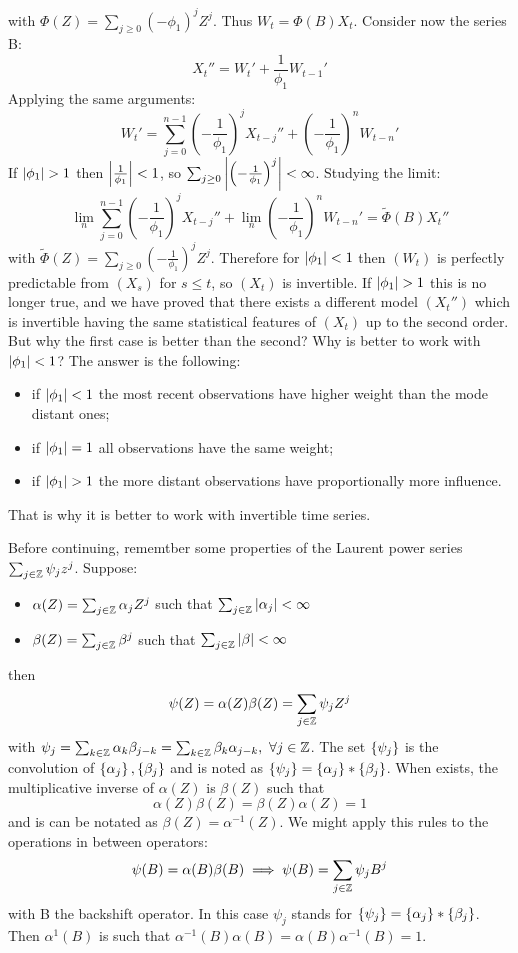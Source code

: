 \begin{example}
\[    \]
    with $\Phi(Z)=\sum_{j\ge0}(-\phi_1)^jZ^j$. Thus $W_t=\Phi(B)X_t$. Consider now the series B:
    \[
        X_t''=W_t'+\frac{1}{\phi_1}W_{t-1}'  
    \]
    Applying the same arguments:
    \[
        W_t'=\sum_{j=0}^{n-1}\left(-\frac{1}{\phi_1}\right)^jX_{t-j}''+\left(-\frac{1}{\phi_1}\right)^nW_{t-n}'
    \]
    If $\abs{\phi_1}>1$ then $\left|\frac{1}{\phi_1}\right|<1$, so $\sum_{j\ge0}\left|\left(-\frac{1}{\phi_1}\right)^j\right|<\infty$. Studying the limit:
    \[
        \lim_n\sum_{j=0}^{n-1}\left(-\frac{1}{\phi_1}\right)^jX_{t-j}''+\lim_n\left(-\frac{1}{\phi_1}\right)^nW_{t-n}'=\tilde{\Phi}(B)X_t'' 
    \]
    with $\tilde{\Phi}(Z)=\sum_{j\ge0}\left(-\frac{1}{\phi_1}\right)^jZ^j$. Therefore for $\left|\phi_1\right|<1$ then $(W_t)$ is perfectly predictable from $(X_s)$ for $s\le t$, so $(X_t)$ is invertible. If $\abs{\phi_1}>1$ this is no longer true, and we have proved that there exists a different model $(X_t'')$ which is invertible having the same statistical features of $(X_t)$ up to the second order. But why the first case is better than the second? Why is better to work with $\left|\phi_1\right|<1$? The answer is the following:
    \begin{itemize}
        \item if $\left|\phi_1\right|<1$ the most recent observations have higher weight than the mode distant ones;
        \item if $\left|\phi_1\right|=1$ all observations have the same weight;
        \item if $\abs{\phi_1}>1$ the more distant observations have proportionally more influence.
    \end{itemize}
    That is why it is better to work with invertible time series.
\end{example}

Before continuing, rememtber some properties of the Laurent power series $\sum_{j\in\mathbb{Z}}\psi_jz^j$. Suppose:
\begin{itemize}
    \item $\alpha(Z)=\sum_{j\in\mathbb{Z}}\alpha_jZ^j$ such that $\sum_{j\in\mathbb{Z}}\left|\alpha_j\right|<\infty$
    \item $\beta(Z)=\sum_{j\in\mathbb{Z}}\beta^j$ such that $\sum_{j\in\mathbb{Z}}\left|\beta\right|<\infty$
\end{itemize}
then
\[
    \psi(Z)=\alpha(Z)\beta(Z)=\sum_{j\in\mathbb{Z}}\psi_jZ^j  
\]
with $\psi_j=\sum_{k\in\Z}\alpha_k\beta_{j-k}=\sum_{k\in\Z}\beta_k\alpha_{j-k},\ \forall j\in\Z$. The set $\left\{\psi_j\right\}$ is the convolution of $\left\{\alpha_j\right\},\left\{\beta_j\right\}$ and is noted as $\left\{\psi_j\right\}=\left\{\alpha_j\right\}*\left\{\beta_j\right\}$. When exists, the multiplicative inverse of $\alpha(Z)$ is $\beta(Z)$ such that
\[
    \alpha(Z)\beta(Z)=\beta(Z)\alpha(Z)=1  
\]
and is can be notated as $\beta(Z)=\alpha^{-1}(Z)$. We might apply this rules to the operations in between operators:
\[
    \psi(B)=\alpha(B)\beta(B)\implies\psi(B)=\sum_{j\in\mathbb{Z}}\psi_jB^j  
\]
with B the backshift operator. In this case $\psi_j$ stands for $\left\{\psi_j\right\}=\left\{\alpha_j\right\}*\left\{\beta_j\right\}$. Then $\alpha^1(B)$ is such that $\alpha^{-1}(B)\alpha(B)=\alpha(B)\alpha^{-1}(B)=1$.

